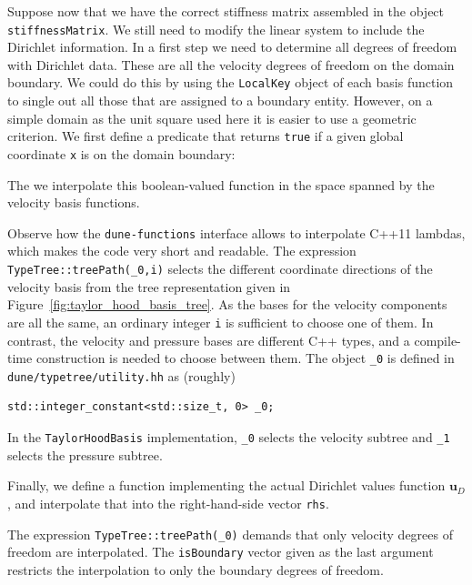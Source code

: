 \documentclass[a4paper,10pt,headings=normal,bibliography=totoc]{scrartcl}
\newcommand{\cpp}[1]{\lstinline[basicstyle=\ttfamily]!#1!}
\newcommand{\dunemodule}[1]{\texttt{#1}}
\newcommand{\file}[1]{\texttt{#1}}
\begin{document}
Suppose now that we have the correct stiffness matrix assembled in the object \cpp{stiffnessMatrix}.  We still need
to modify the linear system to include the Dirichlet information.
In a first step we need to determine all degrees of freedom with Dirichlet data.  These are all the velocity degrees of freedom
on the domain boundary.  We could do this by using the \cpp{LocalKey} object of each basis function
to single out all those that are assigned to a boundary entity.  However, on a simple domain as the unit square
used here it is easier to use a geometric criterion.  We first define a predicate that returns \cpp{true}
if a given global coordinate \cpp{x} is on the domain boundary:
%

%
The we interpolate this boolean-valued function in the space spanned by the velocity basis functions.
%

%
Observe how the \dunemodule{dune-functions} interface allows to interpolate C++11 lambdas, which makes the code
very short and readable.  The expression \cpp{TypeTree::treePath(_0,i)} selects the different coordinate
directions of the velocity basis from the tree representation given in Figure~\ref{fig:taylor_hood_basis_tree}.
As the bases for the velocity components are all the same, an ordinary integer \cpp{i} is sufficient to choose
one of them.  In contrast, the velocity and pressure bases are different C++ types, and a compile-time
construction is needed to choose between them.  The object \cpp{_0} is defined in
\file{dune/typetree/utility.hh} as (roughly)
\begin{lstlisting}[style=Interface]
std::integer_constant<std::size_t, 0> _0;
\end{lstlisting}
In the \cpp{TaylorHoodBasis} implementation, \cpp{_0} selects the velocity subtree and \cpp{_1} selects
the pressure subtree.

Finally, we define a function implementing the actual Dirichlet values function $\mathbf{u}_D$, and interpolate
that into the right-hand-side vector \cpp{rhs}.
%

%
The expression \cpp{TypeTree::treePath(_0)} demands that only velocity degrees of freedom are
interpolated.  The \cpp{isBoundary} vector given as the last argument restricts the interpolation
to only the boundary degrees of freedom.
\end{document}
